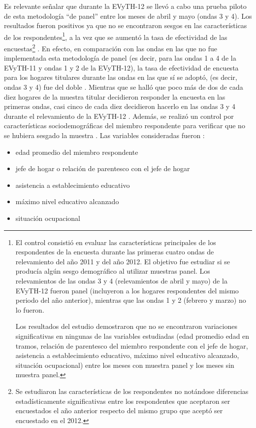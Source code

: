 \documentclass[
  openany]{book}
\begin{document}
Es relevante señalar que durante la EVyTH-12 se llevó a cabo una prueba piloto de esta metodología ``de panel'' entre los meses de abril y mayo (ondas 3 y 4).
Los resultados fueron positivos ya que no se encontraron sesgos en las características de los respondentes\footnote{El control consistió en evaluar las características principales de los respondentes de la encuesta durante las primeras cuatro ondas de relevamiento del año 2011 y del año 2012.
  El objetivo fue estudiar si se producía algún sesgo demográfico al utilizar muestras panel.
  Los relevamientos de las ondas 3 y 4 (relevamientos de abril y mayo) de la EVyTH-12 fueron panel (incluyeron a los hogares respondentes del mismo periodo del año anterior), mientras que las ondas 1 y 2 (febrero y marzo) no lo fueron.

  Los resultados del estudio demostraron que no se encontraron variaciones significativas en ningunas de las variables estudiadas (edad promedio edad en tramos, relación de parentesco del miembro respondente con el jefe de hogar, asistencia a establecimiento educativo, máximo nivel educativo alcanzado, situación ocupacional) entre los meses con muestra panel y los meses sin muestra panel.}, a la vez que se aumentó la tasa de efectividad de las encuestas\footnote{Se estudiaron las características de los respondentes no notándose diferencias estadísticamente significativas entre los respondentes que aceptaron ser encuestados el año anterior respecto del mismo grupo que aceptó ser encuestado en el 2012.}
. En efecto, en comparación con las ondas en las que no fue implementada esta metodología de panel (es decir, para las ondas 1 a 4 de la EVyTH-11 y ondas 1 y 2 de la EVyTH-12), la tasa de efectividad de encuesta para los hogares titulares durante las ondas en las que sí se adoptó, (es decir, ondas 3 y 4) fue del doble
. Mientras que se halló que poco más de dos de cada diez hogares de la muestra titular decidieron responder la encuesta en las primeras ondas, casi cinco de cada diez decidieron hacerlo en las ondas 3 y 4 durante el relevamiento de la EVyTH-12
. Además, se realizó un control por características sociodemográficas del miembro respondente para verificar que no se hubiera sesgado la muestra
. Las variables consideradas fueron
:

\begin{itemize}
\item
  edad promedio del miembro respondente
\item
  jefe de hogar o relación de parentesco con el jefe de hogar
\item
  asistencia a establecimiento educativo
\item
  máximo nivel educativo alcanzado
\item
  situación ocupacional
\end{itemize}
\end{document}
